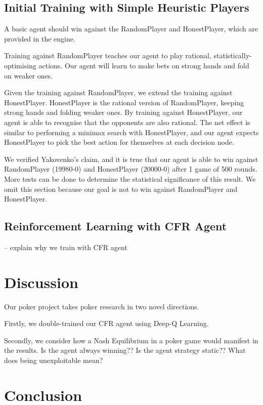 \documentclass{article}
\begin{document}
\subsection{Initial Training with Simple Heuristic Players}
A basic agent should win against the RandomPlayer and HonestPlayer, which are provided in the engine.

Training against RandomPlayer teaches our agent to play rational, statistically-optimising actions. Our agent will learn to make bets on strong hands and fold on weaker ones. 

Given the training against RandomPlayer, we extend the training against HonestPlayer. HonestPlayer is the rational version of RandomPlayer, keeping strong hands and folding weaker ones. By training against HonestPlayer, our agent is able to recognise that the opponents are also rational. The net effect is similar to performing a minimax search with HonestPlayer, and our agent expects HonestPlayer to pick the best action for themselves at each decision node.

We verified Yakovenko's claim, and it is true that our agent is able to win against RandomPlayer (19980-0) and HonestPlayer (20000-0) after 1 game of 500 rounds. More tests can be done to determine the statistical significance of this result. We omit this section because our goal is not to win against RandomPlayer and HonestPlayer.

\subsection{Reinforcement Learning with CFR Agent}

-- explain why we train with CFR agent

\section{Discussion}
Our poker project takes poker research in two novel directions.

Firstly, we double-trained our CFR agent using Deep-Q Learning.

Secondly, we consider how a Nash Equilibrium in a poker game would manifest in the results. Is the agent always winning?? Is the agent strategy static?? What does being unexploitable mean?

\section{Conclusion}
\end{document}

